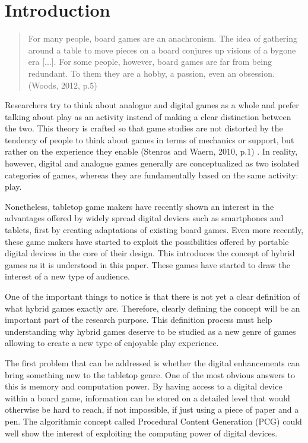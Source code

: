 \chapter{Introduction}
\begin{quotation}
For many people, board games are an anachronism. The idea of gathering around a table to move pieces on a board conjures up visions of a bygone era [...]. For some people, however, board games are far from being redundant. To them they are a hobby, a passion, even an obsession. (Woods, 2012, p.5) \cite{book:euro}
\end{quotation}

Researchers try to think about analogue and digital games as a whole and prefer talking about play as an activity instead of making a clear distinction between the two. This theory is crafted so that game studies are not distorted by the tendency of people to think about games in terms of mechanics or support, but rather on the experience they enable (Stenros and Waern, 2010, p.1) \cite{art:stenroswaern}. In reality, however, digital and analogue games generally are conceptualized as two isolated categories of games, whereas they are fundamentally based on the same activity: play. 

Nonetheless, tabletop game makers have recently shown an interest in the advantages offered by widely spread digital devices such as smartphones and tablets, first by creating adaptations of existing board games. Even more recently, these game makers have started to exploit the possibilities offered by portable digital devices in the core of their design. This introduces the concept of hybrid games as it is understood in this paper. These games have started to draw the interest of a new type of audience.

One of the important things to notice is that there is not yet a clear definition of what hybrid games exactly are. Therefore, clearly defining the concept will be an important part of the research purpose. This definition process must help understanding why hybrid games deserve to be studied as a new genre of games allowing to create a new type of enjoyable play experience. 

The first problem that can be addressed is whether the digital enhancements can bring something new to the tabletop genre. One of the most obvious answers to this is memory and computation power. By having access to a digital device within a board game, information can be stored on a detailed level that would otherwise be hard to reach, if not impossible, if just using a piece of paper and a pen. The algorithmic concept called Procedural Content Generation (PCG) could well show the interest of exploiting the computing power of digital devices. 

